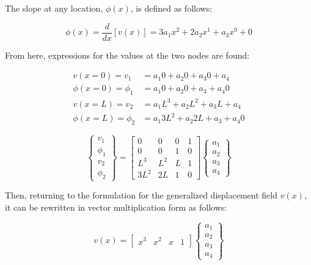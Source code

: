 \documentclass[a4paper]{article}
\begin{document}
The slope at any location, $\phi(x)$, is defined as follows:

\begin{equation*}
\phi(x) = \dfrac{d}{dx}\left[v(x)\right] = 3a_{1}x^{2} + 2a_{2}x^{1} + a_{3}x^{0} + 0
\end{equation*}

From here, expressions for the values at the two nodes are found:

\begin{align*}
v(x=0) = v_{1} & = a_{1}0 + a_{2}0 + a_{3}0 + a_{4}\\
\phi(x=0) = \phi_{1} & = a_{1}0 + a_{2}0 + a_{3} + a_{4}0\\
v(x=L) = v_{2} & = a_{1}L^{3} + a_{2}L^{2} + a_{3}L + a_{4}\\
\phi(x=L) = \phi_{2} & = a_{1}3L^{2} + a_{2}2L + a_{3} + a_{4}0
\end{align*}

\begin{equation*}
\begin{Bmatrix}
    v_{1} \\ \phi_{1} \\ v_{2} \\ \phi_{2}
\end{Bmatrix} =
\begin{bmatrix}
    0 & 0 & 0 & 1\\
    0 & 0 & 1 & 0\\
    L^{3} & L^{2} & L & 1\\
    3L^{2} & 2L & 1 & 0
\end{bmatrix}
\begin{Bmatrix}
    a_{1} \\ a_{2} \\ a_{3} \\ a_{4}
\end{Bmatrix}
\end{equation*}

Then, returning to the formulation for the generalized displacement field $v(x)$, it can be rewritten in vector multiplication form as follows:

\begin{equation*}
v(x) =
\begin{bmatrix}
    x^{3} & x^{2} & x & 1
\end{bmatrix}
\begin{Bmatrix}
    a_{1} \\
    a_{2} \\
    a_{3} \\
    a_{4}
\end{Bmatrix}
\end{equation*}
\end{document}
